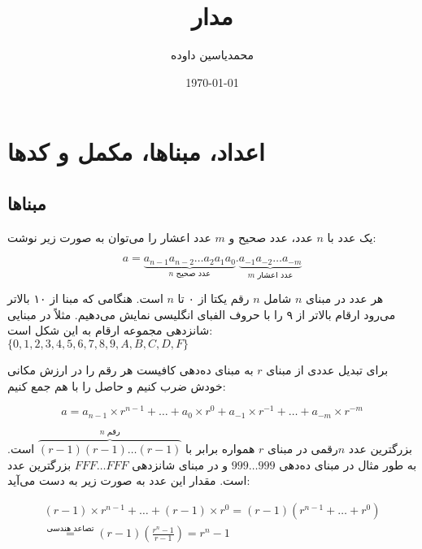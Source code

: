 \documentclass[a5paper]{article}
\author{محمدیاسین داوده}
\title{مدار}
\date{\today}
\begin{document}
\begin{titlingpage}
\maketitle


\tableofcontents
\end{titlingpage}

\section{اعداد، مبناها، مکمل و کدها}
\subsection{مبناها}
یک عدد با $n$ عدد، عدد صحیح و $m$ عدد اعشار را می‌توان به صورت زیر نوشت:

\begin{equation}
  a = \underbrace{a_{n-1}a_{n-2} \ldots a_2a_1a_0}_{\text{$n$ عدد صحیح}}.\underbrace{a_{-1}a_{-2} \ldots a_{-m}}_{\text{$m$ عدد اعشار}}
\end{equation}

هر عدد در مبنای $n$ شامل $n$ رقم یکتا از ۰ تا $n$ است.
هنگامی که مبنا از ۱۰ بالاتر می‌رود ارقام بالاتر از ۹ را با حروف الفبای انگلیسی نمایش می‌دهیم.
مثلاً در مبنایی شانزدهی مجموعه ارقام به این شکل است:\\
$\{0,1,2,3,4,5,6,7,8,9,A,B,C,D,F\}$

برای تبدیل عددی از مبنای $r$ به مبنای ده‌دهی کافیست هر رقم را در
ارزش مکانی خودش ضرب کنیم و حاصل را با هم جمع کنیم:

\begin{equation}
  a = a_{n-1} \times r^{n-1} + \ldots + a_{0} \times r^{0} + a_{-1} \times r^{-1} + \ldots + a_{-m} \times r^{-m}
\end{equation}

بزرگترین عدد $n$رقمی در مبنای $r$ همواره برابر با $\overbrace{(r-1)(r-1)\ldots(r-1)}^{\text{$n$ رقم}}$ است.
به طور مثال در مبنای ده‌دهی $999\ldots999$ و در مبنای شانزدهی $FFF\ldots{}FFF$ بزرگترین عدد است.
مقدار این عدد به صورت زیر به دست می‌آید:

\begin{equation}
\begin{split}
  (r-1) \times r^{n-1} + \ldots + (r-1) \times r^{0} = (r-1)(r^{n-1} + \ldots + r^{0})\\ \stackrel{\text{تصاعد هندسی}}{=} (r-1)(\frac{r^{n}-1}{r-1}) = r^{n} -1
\end{split}
\end{equation}
\end{document}
